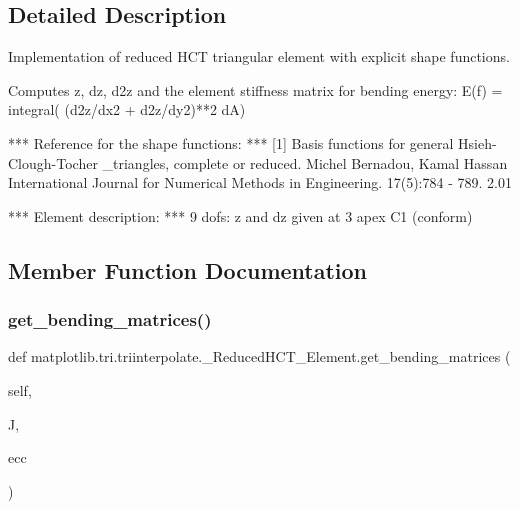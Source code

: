 \subsection{Detailed Description}
\begin{DoxyVerb}Implementation of reduced HCT triangular element with explicit shape
functions.

Computes z, dz, d2z and the element stiffness matrix for bending energy:
E(f) = integral( (d2z/dx2 + d2z/dy2)**2 dA)

*** Reference for the shape functions: ***
[1] Basis functions for general Hsieh-Clough-Tocher _triangles, complete or
    reduced.
    Michel Bernadou, Kamal Hassan
    International Journal for Numerical Methods in Engineering.
    17(5):784 - 789.  2.01

*** Element description: ***
9 dofs: z and dz given at 3 apex
C1 (conform)\end{DoxyVerb}
 

\subsection{Member Function Documentation}
\mbox{\label{classmatplotlib_1_1tri_1_1triinterpolate_1_1__ReducedHCT__Element_a0d08bd16a2f48a0989f0de1efc6c9079}} 
\subsubsection{\texorpdfstring{get\+\_\+bending\+\_\+matrices()}{get\_bending\_matrices()}}
{\footnotesize\ttfamily def matplotlib.\+tri.\+triinterpolate.\+\_\+\+Reduced\+H\+C\+T\+\_\+\+Element.\+get\+\_\+bending\+\_\+matrices (\begin{DoxyParamCaption}\item[{}]{self,  }\item[{}]{J,  }\item[{}]{ecc }\end{DoxyParamCaption})}

